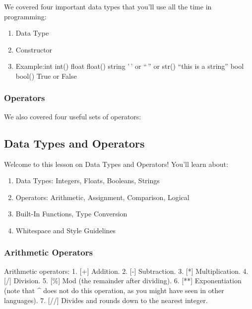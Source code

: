\documentclass[11pt]{article}
\providecommand{\tightlist}{%
      \setlength{\itemsep}{0pt}\setlength{\parskip}{0pt}}
\begin{document}
We covered four important data types that you'll use all the time in
programming:

\begin{enumerate}
\def\labelenumi{\arabic{enumi}.}
\tightlist
\item
  Data Type
\item
  Constructor
\item
  Example:int \textbar{} int() float \textbar{} float() \textbar{}
  string \textbar{} '\,' or ``\,'' or str() \textbar{} ``this is a
  string'' \textbar{} \textbar{} bool \textbar{} bool() \textbar{} True
  or False \textbar{}
\end{enumerate}

    \hypertarget{operators}{%
\subsubsection{Operators}\label{operators}}

We also covered four useful sets of operators:

    

    

    \hypertarget{data-types-and-operators}{%
\subsection{Data Types and Operators}\label{data-types-and-operators}}

Welcome to this lesson on Data Types and Operators! You'll learn about:

\begin{enumerate}
\def\labelenumi{\arabic{enumi}.}
\tightlist
\item
  Data Types: Integers, Floats, Booleans, Strings
\item
  Operators: Arithmetic, Assignment, Comparison, Logical
\item
  Built-In Functions, Type Conversion
\item
  Whitespace and Style Guidelines
\end{enumerate}

    \hypertarget{arithmetic-operators}{%
\subsubsection{Arithmetic Operators}\label{arithmetic-operators}}

Arithmetic operators: 1. {[}+{]} Addition. 2. {[}-{]} Subtraction. 3.
{[}*{]} Multiplication. 4. {[}/{]} Division. 5. {[}\%{]} Mod (the
remainder after dividing). 6. {[}**{]} Exponentiation (note that \^{}
does not do this operation, as you might have seen in other languages).
7. {[}//{]} Divides and rounds down to the nearest integer.
\end{document}
